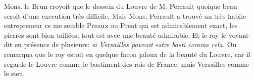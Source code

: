 \pend%
\pstart%
Mons. le Brun\protect{} croyoit que le dessein du Louvre\protect{} de M. Perrault\protect{} quoique beau seroit d'une execution tr\`{e}s difficile. Mais Mons. Perrault\protect{} a trouv\'{e} un tr\`{e}s habile entrepreneur ce me semble Preaux ou Preat qui est admirablement exact, les pierres sont bien taill\'{e}es, tout est avec une beaut\'{e} admirable. Et le roy\protect{} le voyant dit en pr\'{e}sence de plusieurs:
\textit{si Versailles\protect{} pouvoit estre basti comme cela.}
On remarqua que le roy\protect{} estoit en quelque facon jaloux de la beaut\'{e} du Louvre\protect{}, car il regarde le Louvre\protect{} comme le bastiment des rois de France\protect{}, mais Versailles\protect{} comme le sien.
\pend%
\count{}
\count{}
\count{}
